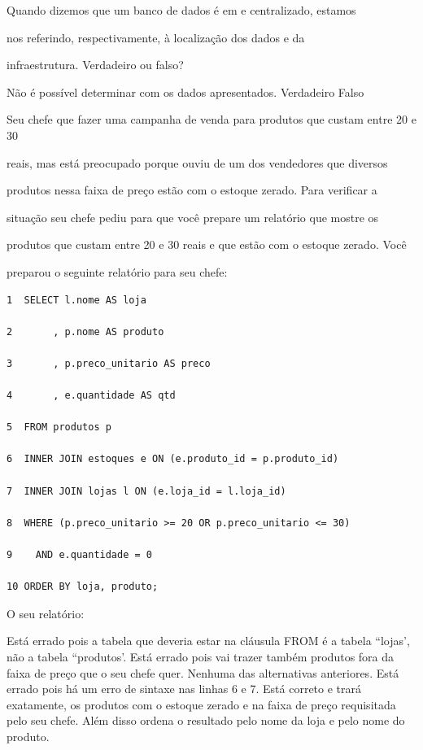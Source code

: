 \documentclass[12pt, addpoints]{exam}
\begin{document}
\begin{questions}
\question

Quando dizemos que um banco de dados é em  e centralizado, estamos

nos referindo, respectivamente, à localização dos dados e da

infraestrutura. Verdadeiro ou falso?
\begin{choices}
\choice Não é possível determinar com os dados apresentados.
\choice Verdadeiro
\choice Falso
\end{choices}

\question

Seu chefe que fazer uma campanha de venda para produtos que custam entre 20 e 30

reais, mas está preocupado porque ouviu de um dos vendedores que diversos

produtos nessa faixa de preço estão com o estoque zerado. Para verificar a

situação seu chefe pediu para que você prepare um relatório que mostre os

produtos que custam entre 20 e 30 reais e que estão com o estoque zerado. Você

preparou o seguinte relatório para seu chefe:

\begin{tcolorbox}

 \begin{verbatim}1  SELECT l.nome AS loja

2       , p.nome AS produto

3       , p.preco_unitario AS preco

4       , e.quantidade AS qtd

5  FROM produtos p

6  INNER JOIN estoques e ON (e.produto_id = p.produto_id)

7  INNER JOIN lojas l ON (e.loja_id = l.loja_id)

8  WHERE (p.preco_unitario >= 20 OR p.preco_unitario <= 30)

9    AND e.quantidade = 0

10 ORDER BY loja, produto;

 \end{verbatim}

\end{tcolorbox}

O seu relatório:
\begin{choices}
\choice Está errado pois a tabela que deveria estar na cláusula FROM é a tabela ``lojas', não a tabela ``produtos'.
\choice Está errado pois vai trazer também produtos fora da faixa de preço que o seu chefe quer.
\choice Nenhuma das alternativas anteriores.
\choice Está errado pois há um erro de sintaxe nas linhas 6 e 7.
\choice Está correto e trará exatamente, os produtos com o estoque zerado e na faixa de preço requisitada pelo seu chefe. Além disso ordena o resultado pelo nome da loja e pelo nome do produto.
\end{choices}


\end{questions}
\end{document}
